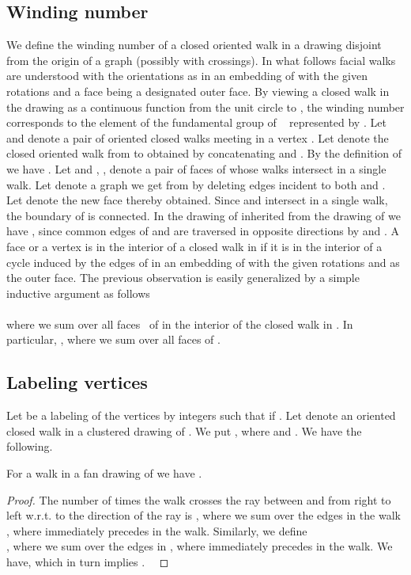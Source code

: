 \documentclass{llncs}
\def\qed{ \ \vrule width.2cm height.2cm depth0cm\smallskip}
\begin{document}
\subsection{Winding number} 
\label{sec:wnwn1}
We define the winding number  of a closed oriented walk  in a drawing disjoint from the origin of a graph  (possibly with crossings). In what follows  facial walks are understood with the orientations as in
  an embedding of  with the given rotations and a face  being a designated outer face.
By viewing a closed walk  in the drawing  as a continuous  function  from the unit circle  to ,
the winding number  corresponds to the element of the fundamental group of  ~\cite[Chapter 1.1]{Hatch02}  represented by .
Let  and  denote a pair of oriented closed walks meeting in a vertex .
Let  denote the closed oriented walk from  to  obtained by concatenating  and .
By the definition of  we have .
Let  and , , denote a pair of faces of  whose walks intersect in a single walk.
Let  denote a graph we get from  by deleting edges incident to both  and .
Let  denote the new face thereby obtained. Since  and  intersect in a single walk, the boundary of  is connected.
In the drawing of  inherited from the drawing of  we have , since common edges of  and  are traversed
in opposite directions by  and .
A face  or a vertex is in the interior of a closed walk  in  if it is in the interior of 
a cycle induced by the edges of  in an embedding of  with the given rotations and   as the outer face.
The previous observation is easily generalized by a simple inductive argument 
as follows \\
 \\
 where we sum over all  faces~ of  in the interior of the
closed walk  in . In particular, , where we sum over all 
 faces   of .

\subsection{Labeling vertices} 
\label{sec:wnwn}
Let  be a labeling of the vertices  by integers
such that  if .
 Let  denote an oriented closed  walk in a clustered drawing of  . We put ,
 where  and .
We have the following.

\begin{lemma}
\label{lemma:wn}
For a walk  in a fan drawing of  we have .
\end{lemma}

\begin{proof}
The number of times
the walk  crosses the ray between  and  from right
to left w.r.t. to the direction of the ray is , 
where we sum over the edges  in the walk , where
  immediately precedes  in the walk.
 Similarly, we define \\  , 
where we sum over the edges  in , where
  immediately precedes  in the walk.
We have, 
which in turn implies .
\qed\end{proof}
\end{document}
